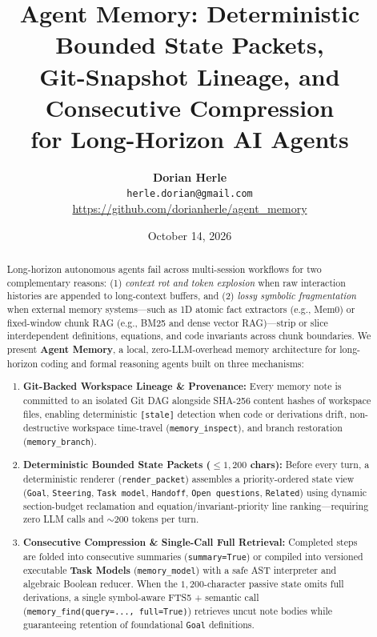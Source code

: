\documentclass[11pt,a4paper]{article}
\title{\textbf{Agent Memory: Deterministic Bounded State Packets,\\Git-Snapshot Lineage, and Consecutive Compression\\for Long-Horizon AI Agents}}
\author{
    \textbf{Dorian Herle}\\
    \texttt{herle.dorian@gmail.com}\\
    \small\url{https://github.com/dorianherle/agent_memory}
}
\date{October 14, 2026}
\begin{document}
\sloppy

\maketitle

\begin{abstract}
\noindent
Long-horizon autonomous agents fail across multi-session workflows for two complementary reasons: (1) \emph{context rot and token explosion} when raw interaction histories are appended to long-context buffers, and (2) \emph{lossy symbolic fragmentation} when external memory systems---such as 1D atomic fact extractors (e.g., Mem0) or fixed-window chunk RAG (e.g., BM25 and dense vector RAG)---strip or slice interdependent definitions, equations, and code invariants across chunk boundaries. We present \textbf{Agent Memory}, a local, zero-LLM-overhead memory architecture for long-horizon coding and formal reasoning agents built on three mechanisms:
\begin{enumerate}[leftmargin=1.5em,itemsep=2pt,topsep=3pt]
    \item \textbf{Git-Backed Workspace Lineage \& Provenance:} Every memory note is committed to an isolated Git DAG alongside SHA-256 content hashes of workspace files, enabling deterministic \texttt{[stale]} detection when code or derivations drift, non-destructive workspace time-travel (\texttt{memory\_inspect}), and branch restoration (\texttt{memory\_branch}).
    \item \textbf{Deterministic Bounded State Packets ($\le 1{,}200$ chars):} Before every turn, a deterministic renderer (\texttt{render\_packet}) assembles a priority-ordered state view (\texttt{Goal}, \texttt{Steering}, \texttt{Task model}, \texttt{Handoff}, \texttt{Open questions}, \texttt{Related}) using dynamic section-budget reclamation and equation/invariant-priority line ranking---requiring zero LLM calls and $\sim 200$ tokens per turn.
    \item \textbf{Consecutive Compression \& Single-Call Full Retrieval:} Completed steps are folded into consecutive summaries (\texttt{summary=True}) or compiled into versioned executable \textbf{Task Models} (\texttt{memory\_model}) with a safe AST interpreter and algebraic Boolean reducer. When the $1{,}200$-character passive state omits full derivations, a single symbol-aware FTS5 + semantic call (\texttt{memory\_find(query=..., full=True)}) retrieves uncut note bodies while guaranteeing retention of foundational \texttt{Goal} definitions.
\end{enumerate}

\end{abstract}
\end{document}

